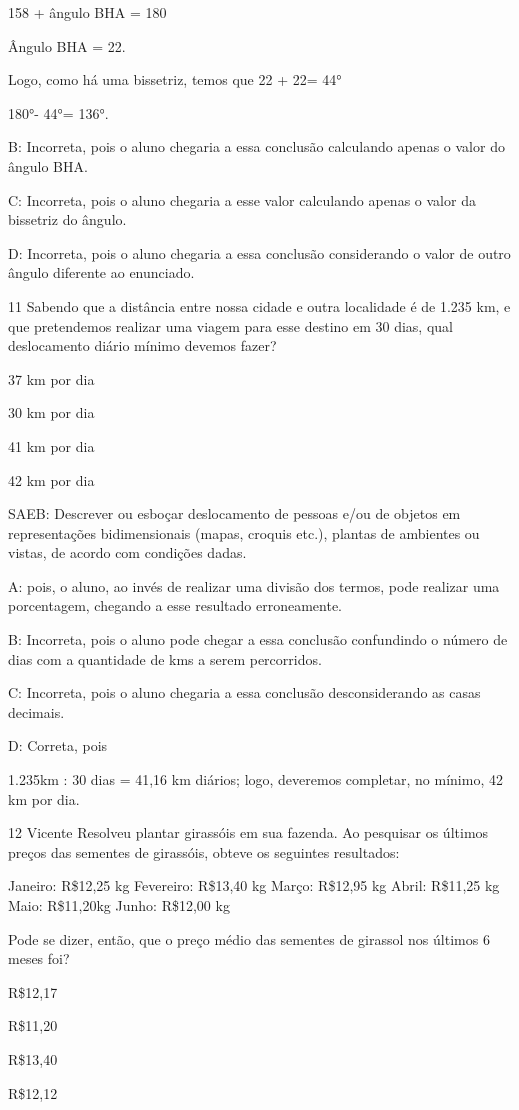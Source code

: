 {158 + ângulo BHA = 180

Ângulo BHA = 22.

Logo, como há uma bissetriz, temos que 22 + 22= 44°

180°- 44°= 136°.

B: Incorreta, pois o aluno chegaria a essa conclusão calculando apenas o
valor do ângulo BHA.

C: Incorreta, pois o aluno chegaria a esse valor calculando apenas o
valor da bissetriz do ângulo.

D: Incorreta, pois o aluno chegaria a essa conclusão considerando o
valor de outro ângulo diferente ao enunciado.

\num{11} Sabendo que a distância entre nossa cidade e outra localidade é de
1.235 km, e que pretendemos realizar uma viagem para esse destino em 30
dias, qual deslocamento diário mínimo devemos fazer?
\item 37 km por dia
\item 30 km por dia
\item 41 km por dia
\item 42 km por dia

SAEB: Descrever ou esboçar deslocamento de pessoas e/ou de objetos em
representações bidimensionais (mapas, croquis etc.), plantas de
ambientes ou vistas, de acordo com condições dadas.

A: pois, o aluno, ao invés de realizar uma divisão dos termos, pode
realizar uma porcentagem, chegando a esse resultado erroneamente.

B: Incorreta, pois o aluno pode chegar a essa conclusão confundindo o
número de dias com a quantidade de kms a serem percorridos.

C: Incorreta, pois o aluno chegaria a essa conclusão desconsiderando as
casas decimais.

D: Correta, pois

1.235km : 30 dias = 41,16 km diários; logo, deveremos completar, no
mínimo, 42 km por dia.

\num{12} Vicente Resolveu plantar girassóis em sua fazenda. Ao pesquisar os
últimos preços das sementes de girassóis, obteve os seguintes
resultados:

Janeiro: R\$12,25 kg Fevereiro: R\$13,40 kg Março: R\$12,95 kg Abril:
R\$11,25 kg Maio: R\$11,20kg Junho: R\$12,00 kg

Pode se dizer, então, que o preço médio das sementes de girassol nos
últimos 6 meses foi?
\item R\$12,17
\item R\$11,20
\item R\$13,40
\item R\$12,12

}
